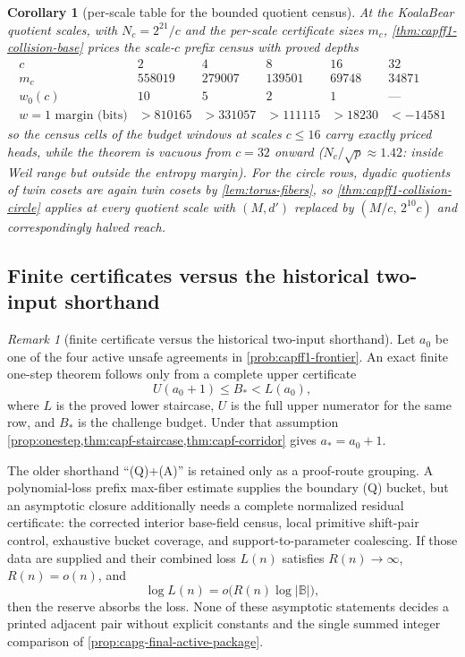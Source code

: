 \documentclass[11pt]{article}
\newtheorem{corollary}[corollary]{Corollary}
\theoremstyle{definition}
\theoremstyle{remark}
\newtheorem{remark}[remark]{Remark}
\newcommand{\B}{\mathbb{B}}
\begin{document}
\begin{corollary}[per-scale table for the bounded quotient census]\label{cor:capff1-quotient-scales}
At the KoalaBear quotient scales, with $N_c=2^{21}/c$ and the per-scale certificate sizes $m_c$, \cref{thm:capff1-collision-base} prices the scale-$c$ prefix census with proved depths
\[
\begin{array}{c|ccccc}
c & 2 & 4 & 8 & 16 & 32\\ \hline
m_c & 558019 & 279007 & 139501 & 69748 & 34871\\
w_0(c) & 10 & 5 & 2 & 1 & \text{---}\\
w=1\text{ margin (bits)} & >810165 & >331057 & >111115 & >18230 & <-14581
\end{array}
\]
so the census cells of the budget windows at scales $c\le16$ carry exactly priced heads, while the theorem is vacuous from $c=32$ onward \textup{($N_c/\sqrt p\approx1.42$: inside Weil range but outside the entropy margin)}.  For the circle rows, dyadic quotients of twin cosets are again twin cosets by \cref{lem:torus-fibers}, so \cref{thm:capff1-collision-circle} applies at every quotient scale with $(M,d')$ replaced by $(M/c,\,2^{10}c)$ and correspondingly halved reach.
\end{corollary}

\subsection{Finite certificates versus the historical two-input shorthand}

\begin{remark}[finite certificate versus the historical two-input shorthand]\label{prop:capff1-closing}
Let $a_0$ be one of the four active unsafe agreements in \cref{prob:capff1-frontier}.  An exact finite one-step theorem follows only from a complete upper certificate
\[
        U(a_0+1)\le B_*<L(a_0),
\]
where $L$ is the proved lower staircase, $U$ is the full upper numerator for the same row, and $B_*$ is the challenge budget.  Under that assumption \cref{prop:onestep,thm:capf-staircase,thm:capf-corridor} gives $a_*=a_0+1$.

The older shorthand ``\textup{(Q)}+\textup{(A)}'' is retained only as a proof-route grouping.  A polynomial-loss prefix max-fiber estimate supplies the boundary \textup{(Q)} bucket, but an asymptotic closure additionally needs a complete normalized residual certificate: the corrected interior base-field census, local primitive shift-pair control, exhaustive bucket coverage, and support-to-parameter coalescing.  If those data are supplied and their combined loss $L(n)$ satisfies $R(n)\to\infty$, $R(n)=o(n)$, and
\[
        \log L(n)=o\!\bigl(R(n)\log|\B|\bigr),
\]
then the reserve absorbs the loss.  None of these asymptotic statements decides a printed adjacent pair without explicit constants and the single summed integer comparison of \cref{prop:capg-final-active-package}.
\end{remark}
\end{document}
